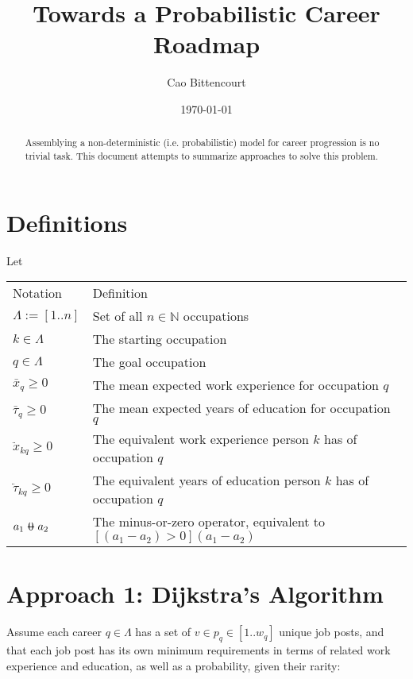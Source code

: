 \documentclass[12pt, a4paper]{article}
\title{
    Towards a Probabilistic Career Roadmap
}
\author{Cao Bittencourt}
\date{\today}
\makeatletter
\newcommand{\superimpose}[2]{{
  \ooalign{
    \hfil$\m@th#1\@firstoftwo#2$\hfil\cr
    \hfil$\m@th#1\@secondoftwo#2$\hfil\cr
  }
}}
\newcommand{\stack}[2]{\mathbin{\mathpalette\superimpose{{#1}{#2}}}}
\newcommand{\minuszero}{\stack{0}{-}}
\makeatother
\begin{document}
\maketitle

\begin{abstract}
  \noindent
  Assemblying a non-deterministic (i.e. probabilistic) model for career progression is no trivial task. This document attempts to summarize approaches to solve this problem.
\end{abstract}

\section{Definitions}
Let \newline \newline
\begin{tabular}{ll}
  Notation                  & Definition                                                                        \\
  $\Lambda := [1 .. n]$     & Set of all $n \in \mathbb{N}$ occupations                                         \\
  $k \in \Lambda$           & The starting occupation                                                           \\
  $q \in \Lambda$           & The goal occupation                                                               \\
  $\bar{x}_q \geq 0$        & The mean expected work experience for occupation $q$                              \\
  $\bar{\tau}_q \geq 0$     & The mean expected years of education for occupation $q$                           \\
  $\ddot{x}_{kq} \geq 0$    & The equivalent work experience person $k$ has of occupation $q$                   \\
  $\ddot{\tau}_{kq} \geq 0$ & The equivalent years of education person $k$ has of occupation $q$                \\
  $a_{1} \minuszero a_{2}$  & The minus-or-zero operator, equivalent to $[(a_{1} - a_{2}) > 0] (a_{1} - a_{2})$ \\
\end{tabular}

\section{Approach 1: Dijkstra's Algorithm}
Assume each career $q \in \Lambda$ has a set of $v \in p_q \in [1 .. w_q]$
unique job posts, and that each job post has its own minimum requirements in
terms of related work experience and education, as well as a probability, given
their rarity:
\end{document}
